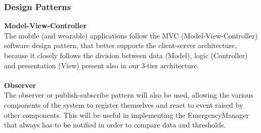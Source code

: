 \subsubsection{Design Patterns}
\textbf{Model-View-Controller}\\

The mobile (and wearable) applications follow the MVC (Model-View-Controller) software design pattern, that better supports the client-server architecture, because it closely follows the division between data (Model), logic (Controller) and presentation (View) present also in our 3-tier architecture.\\
\\
\textbf{Observer}\\

The observer or publish-subscribe pattern will also be used, allowing the various components of the system to register themselves and react to event raised by other components. This will be useful in implementing the EmergencyManager that always has to be notified in order to compare data and thresholds.
%